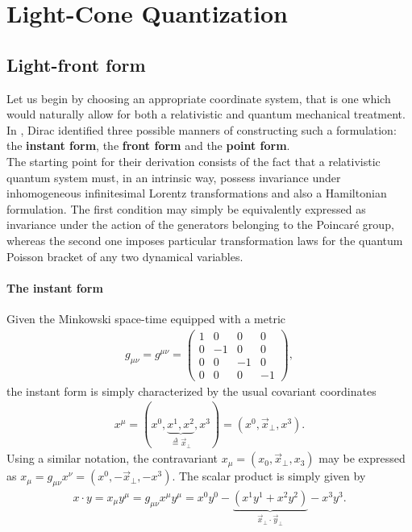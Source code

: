 
\chapter{Light-Cone Quantization}
\section{Light-front form}
Let us begin by choosing an appropriate coordinate system, that is one which would naturally allow for both a relativistic and quantum mechanical treatment. In \cite{reldyn}, Dirac identified three possible manners of constructing such a formulation: the \textbf{\textsf{\color{ming}instant form}}, the \textbf{\textsf{\color{ming}front form}} and the \textbf{\textsf{\color{ming}point form}}. \\
The starting point for their derivation consists of the fact that a relativistic quantum system must, in an intrinsic way, possess invariance under inhomogeneous infinitesimal Lorentz transformations and also a Hamiltonian formulation. The first condition may simply be equivalently expressed as invariance under the action of the generators belonging to the Poincar\'e group, whereas the second one imposes particular transformation laws for the quantum Poisson bracket of any two dynamical variables. 

\subsubsection*{The instant form}
Given the Minkowski space-time equipped with a metric
\begin{align*}
g_{\mu\nu}=g^{\mu\nu}=
\left( \begin{array}{cccc}
1 & 0  & 0  & 0\\
0 & -1 & 0  & 0\\
0 & 0  & -1 & 0\\
0 & 0  & 0  & -1\end{array} \right),
\end{align*}
the instant form is simply characterized by the usual covariant coordinates
\begin{align*}
x^\mu=(x^0,\underbrace{x^1,x^2}_{\overset{\Delta}{=} \vec{x}_\perp},x^3)=(x^0,\vec{x}_\perp,x^3).
\end{align*}
Using a similar notation, the contravariant $x_\mu=(x_0,\vec{x}_\perp,x_3)$ may be expressed as $x_\mu=g_{\mu\nu}x^\nu=(x^0,-\vec{x}_\perp,-x^3)$. The scalar product is simply given by
\begin{align*}
x\cdot y=x_\mu y^\mu=g_{\mu\nu}x^\mu y^\mu=x^0y^0-\underbrace{(x^1y^1+x^2y^2)}_{\vec{x}_\perp\cdot \vec{y}_\perp}-x^3y^3.
\end{align*}

